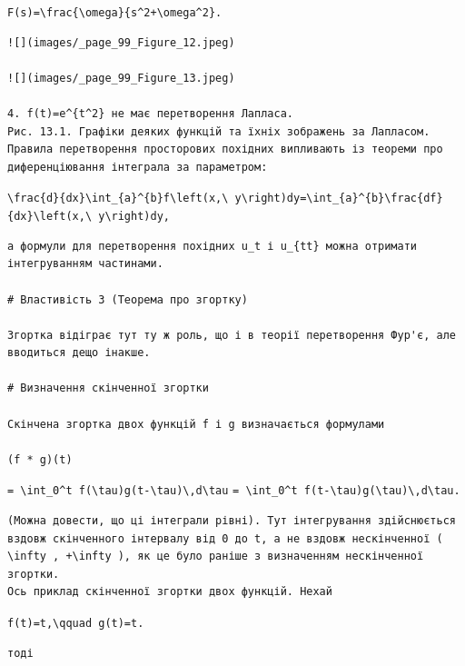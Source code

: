 \documentclass[
  ukrainian,
]{article}
\begin{document}
\texttt{F(s)=\textbackslash{}frac\{\textbackslash{}omega\}\{s\^{}2+\textbackslash{}omega\^{}2\}.}

\begin{verbatim}
![](images/_page_99_Figure_12.jpeg)

![](images/_page_99_Figure_13.jpeg)

4. f(t)=e^{t^2} не має перетворення Лапласа.
Рис. 13.1. Графіки деяких функцій та їхніх зображень за Лапласом.
Правила перетворення просторових похідних випливають із теореми про диференціювання інтеграла за параметром:
\end{verbatim}

\texttt{\textbackslash{}frac\{d\}\{dx\}\textbackslash{}int\_\{a\}\^{}\{b\}f\textbackslash{}left(x,\textbackslash{}\ y\textbackslash{}right)dy=\textbackslash{}int\_\{a\}\^{}\{b\}\textbackslash{}frac\{df\}\{dx\}\textbackslash{}left(x,\textbackslash{}\ y\textbackslash{}right)dy,}

\begin{verbatim}
а формули для перетворення похідних u_t і u_{tt} можна отримати інтегруванням частинами.

# Властивість 3 (Теорема про згортку)

Згортка відіграє тут ту ж роль, що і в теорії перетворення Фур'є, але вводиться дещо інакше.

# Визначення скінченної згортки

Скінчена згортка двох функцій f і g визначається формулами

(f * g)(t)
\end{verbatim}

\texttt{=\ \textbackslash{}int\_0\^{}t\ f(\textbackslash{}tau)g(t-\textbackslash{}tau)\textbackslash{},d\textbackslash{}tau}
\texttt{=\ \textbackslash{}int\_0\^{}t\ f(t-\textbackslash{}tau)g(\textbackslash{}tau)\textbackslash{},d\textbackslash{}tau.}

\begin{verbatim}
(Можна довести, що ці інтеграли рівні). Тут інтегрування здійснюється вздовж скінченного інтервалу від 0 до t, а не вздовж нескінченної ( \infty , +\infty ), як це було раніше з визначенням нескінченної згортки.
Ось приклад скінченної згортки двох функцій. Нехай
\end{verbatim}

\texttt{f(t)=t,\textbackslash{}qquad\ g(t)=t.}

\begin{verbatim}
тоді
\end{verbatim}
\end{document}
